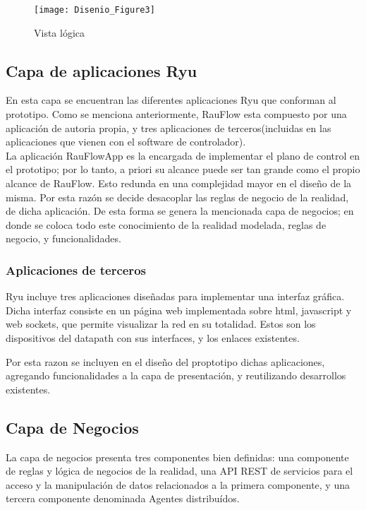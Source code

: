 \begin{figure}[ht!] 
\centering    
\texttt{[image: Disenio\_Figure3]}
\caption[Vista l\'ogica]{Vista l\'ogica}
\label{fig:VistaComponentes2}
\end{figure}

\subsection{Capa de aplicaciones Ryu}
En esta capa se encuentran las diferentes aplicaciones Ryu que conforman al prototipo. Como se menciona anteriormente, RauFlow esta compuesto por una aplicaci\'on de autoria propia, y tres aplicaciones de terceros(incluidas en las aplicaciones que vienen con el software de controlador).\\

La aplicaci\'on RauFlowApp es la encargada de implementar el plano de control en el prototipo; por lo tanto, a priori su alcance puede ser tan grande como el propio alcance de RauFlow. Esto redunda en una complejidad mayor en el dise\~no de la misma. Por esta razón se decide desacoplar las reglas de negocio de la realidad, de dicha aplicación. De esta forma se genera la mencionada capa de negocios; en donde se coloca todo este conocimiento de la realidad modelada, reglas de negocio, y funcionalidades.  

\subsubsection{Aplicaciones de terceros}
Ryu incluye tres aplicaciones dise\~nadas para implementar una interfaz gr\'afica. Dicha interfaz consiste en un p\'agina web implementada sobre html, javascript y web sockets, que permite visualizar la red en su totalidad. Estos son los dispositivos del datapath con sus interfaces, y los enlaces existentes.

Por esta razon se incluyen en el dise\~no del proptotipo dichas aplicaciones, agregando funcionalidades  a la capa de presentaci\'on, y reutilizando desarrollos existentes.

\subsection{Capa de Negocios}
La capa de negocios presenta tres componentes bien definidas: una componente de reglas y l\'ogica de negocios de la realidad, una API REST de servicios para el acceso y la manipulaci\'on de datos relacionados a la primera componente, y una tercera componente denominada Agentes distribu\'idos.

